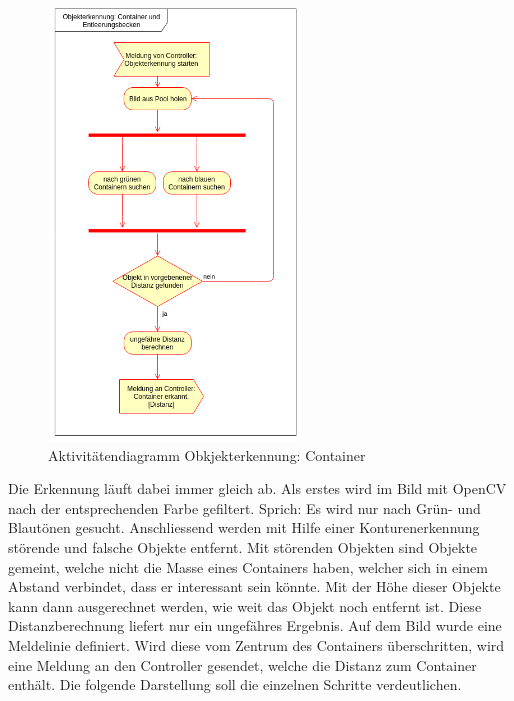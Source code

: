 \begin{figure}[H]%
\centering
\includegraphics[width=0.6\textwidth]{03_Loesungskonzept/pictures/objekterkennung_containers.png}
\caption{Aktivitätendiagramm Obkjekterkennung: Container}
\label{fig:activityContainer}
\end{figure}
\newpage
Die Erkennung läuft dabei immer gleich ab. Als erstes wird im Bild mit OpenCV nach der entsprechenden Farbe gefiltert. Sprich: Es wird nur nach Grün- und Blautönen gesucht. Anschliessend werden mit Hilfe einer Konturenerkennung störende und falsche Objekte entfernt. Mit störenden Objekten sind Objekte gemeint, welche nicht die Masse eines Containers haben, welcher sich in einem Abstand verbindet, dass er interessant sein könnte. Mit der Höhe dieser Objekte kann dann ausgerechnet werden, wie weit das Objekt  noch entfernt ist. Diese Distanzberechnung liefert nur ein ungefähres Ergebnis. Auf dem Bild wurde eine Meldelinie definiert. Wird diese vom Zentrum des Containers überschritten, wird eine Meldung an den Controller gesendet, welche die Distanz zum Container enthält. Die folgende Darstellung soll die einzelnen Schritte verdeutlichen.
